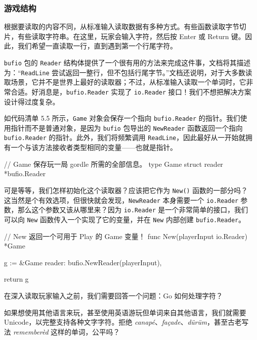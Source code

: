 \subsubsection*{游戏结构}

根据要读取的内容不同，从标准输入读取数据有多种方式。有些函数读取字节切片，有些读取字符串。在这里，玩家会输入字符，然后按 Enter 或 Return 键。因此，我们希望一直读取一行，直到遇到第一个行尾字符。

\texttt{bufio} 包的 \texttt{Reader} 结构体提供了一个很有用的方法来完成这件事，文档将其描述为：“\texttt{ReadLine} 尝试返回一整行，但不包括行尾字节。”文档还说明，对于大多数读取场景，它并不是世界上最好的读取器；不过，从标准输入读取一个单词时，它非常合适。好消息是，\texttt{bufio.Reader} 实现了 \texttt{io.Reader} 接口！我们不想把解决方案设计得过度复杂。

如代码清单 5.5 所示，\texttt{Game} 对象会保存一个指向 \texttt{bufio.Reader} 的指针。我们使用指针而不是普通对象，是因为 \texttt{bufio} 包导出的 \texttt{NewReader} 函数返回一个指向 \texttt{bufio.Reader} 的指针。此外，我们将频繁调用 \texttt{ReadLine}，因此最好从一开始就拥有一个与该方法接收者类型相同的变量——也就是指针。

\begin{gocode}[title={代码清单 5.5 \texttt{game.go}：让 \texttt{Game} 使用读取器}]
// Game 保存玩一局 gordle 所需的全部信息。
type Game struct {
    reader *bufio.Reader
}
\end{gocode}

可是等等，我们怎样初始化这个读取器？应该把它作为 \texttt{New()} 函数的一部分吗？这当然是个有效选项，但很快就会发现，\texttt{NewReader} 本身需要一个 \texttt{io.Reader} 参数，那么这个参数又该从哪里来？因为 \texttt{io.Reader} 是一个非常简单的接口，我们可以向
\texttt{New} 函数传入一个实现了它的变量，并在 \texttt{New} 内部创建 \texttt{bufio.Reader}。

\begin{gocode}[title={代码清单 5.6 \texttt{game.go}：以读取器作为参数使用 \texttt{New}}]
// New 返回一个可用于 Play 的 Game 变量！
func New(playerInput io.Reader) *Game {
    g := &Game{
        reader: bufio.NewReader(playerInput),
    }

    return g
}
\end{gocode}

在深入读取玩家输入之前，我们需要回答一个问题：Go 如何处理字符？

如果想使用其他语言来玩，甚至使用英语游玩但单词来自其他语言，我们就需要 Unicode，以完整支持各种文字字符。拒绝 \emph{canapé}、\emph{façade}、\emph{dürüm}，甚至古老写法 \emph{rememberèd} 这样的单词，公平吗？

